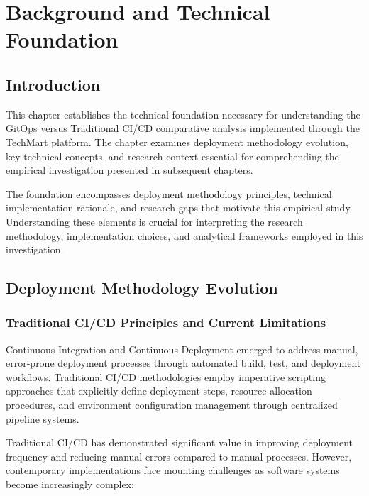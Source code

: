 \chapter{Background and Technical Foundation}

\section{Introduction}

This chapter establishes the technical foundation necessary for understanding the GitOps versus Traditional CI/CD comparative analysis implemented through the TechMart platform. The chapter examines deployment methodology evolution, key technical concepts, and research context essential for comprehending the empirical investigation presented in subsequent chapters.

The foundation encompasses deployment methodology principles, technical implementation rationale, and research gaps that motivate this empirical study. Understanding these elements is crucial for interpreting the research methodology, implementation choices, and analytical frameworks employed in this investigation.

\section{Deployment Methodology Evolution}

\subsection{Traditional CI/CD Principles and Current Limitations}

Continuous Integration and Continuous Deployment emerged to address manual, error-prone deployment processes through automated build, test, and deployment workflows. Traditional CI/CD methodologies employ imperative scripting approaches that explicitly define deployment steps, resource allocation procedures, and environment configuration management through centralized pipeline systems.

Traditional CI/CD has demonstrated significant value in improving deployment frequency and reducing manual errors compared to manual processes. However, contemporary implementations face mounting challenges as software systems become increasingly complex:

